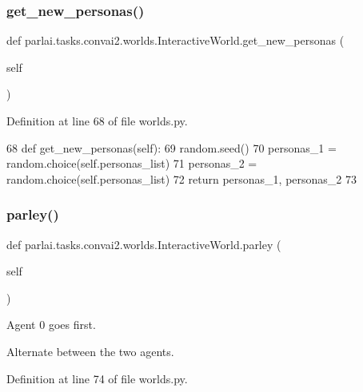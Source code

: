 \subsubsection{\texorpdfstring{get\+\_\+new\+\_\+personas()}{get\_new\_personas()}}
{\footnotesize\ttfamily def parlai.\+tasks.\+convai2.\+worlds.\+Interactive\+World.\+get\+\_\+new\+\_\+personas (\begin{DoxyParamCaption}\item[{}]{self }\end{DoxyParamCaption})}



Definition at line 68 of file worlds.\+py.


\begin{DoxyCode}
68     \textcolor{keyword}{def }get\_new\_personas(self):
69         random.seed()
70         personas\_1 = random.choice(self.personas\_list)
71         personas\_2 = random.choice(self.personas\_list)
72         \textcolor{keywordflow}{return} personas\_1, personas\_2
73 
\end{DoxyCode}
\mbox{\label{classparlai_1_1tasks_1_1convai2_1_1worlds_1_1InteractiveWorld_a75559c133b900cdd71389c9760e9a703}} 
\subsubsection{\texorpdfstring{parley()}{parley()}}
{\footnotesize\ttfamily def parlai.\+tasks.\+convai2.\+worlds.\+Interactive\+World.\+parley (\begin{DoxyParamCaption}\item[{}]{self }\end{DoxyParamCaption})}

\begin{DoxyVerb}Agent 0 goes first.

Alternate between the two agents.
\end{DoxyVerb}
 

Definition at line 74 of file worlds.\+py.


